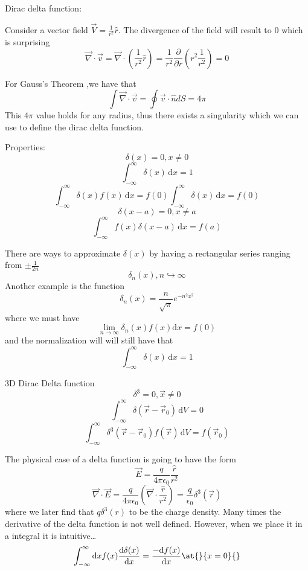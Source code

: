 \begin{remark}
    Dirac delta function:

    Consider a vector field \( \vec{V} = \frac{1}{r^2} \hat{r} \). 
    The divergence of the field will result to 0 which is surprising 
    \[
        \vec{\nabla} \cdot \vec{v} = \vec{\nabla} \cdot \left( \frac{1}{r^2} \hat{r} \right) = \frac{1}{r^2} \frac{\partial }{\partial r} \left( r^2 \frac{1}{r^2} \right) 
        = 0
    \]

    For Gauss's Theorem ,we have that 
    \[
        \int  \vec{\nabla}  \cdot \vec{v} = \oint \vec{v} \cdot \hat{n} dS = 4\pi 
    \]
    This \(4\pi \) value holds for any radius, thus there exists a singularity which we can use to define 
    the dirac delta function. 
    \begin{definition}
        Properties:
        \[
            \delta (x) = 0, x \neq 0
        \]
        \[
            \int_{-\infty}^{\infty} \delta (x)  \,\mathrm{d}x  = 1 
        \]
        \[
            \int_{-\infty}^{\infty} \delta (x) f(x)  \,\mathrm{d}x = f(0) \int_{-\infty}^{\infty}  \delta (x) \,\mathrm{d}x  = f(0)
        \]
        \[
            \delta (x-a) = 0, x \neq a
        \]
        \[
            \int_{-\infty}^{\infty}  f(x) \delta (x-a)\,\mathrm{d}x  = f(a)
        \]
    \end{definition}
    There are ways to approximate \(\delta (x)\) by having a rectangular series ranging from \( \pm\frac{1}{2n}\) 
    \[
        \delta _n (x), n \hookrightarrow \infty 
    \]
    Another example is the function 
    \[
        \delta _n(x) = \frac{n}{\sqrt{\pi } } e^{-n^2 x^{2} } 
    \]
    where we must have 
    \[
        \lim_{n \to \infty} \delta _n(x) f(x) \mathrm{d}x  = f(0)
    \] and the normalization will will still have that 
    \[
        \int_{-\infty}^{\infty}  \delta (x)\,\mathrm{d}x   = 1
    \]

    \begin{definition}
        3D Dirac Delta function
        \[
            \delta ^{3} = 0 , \vec{x} \neq  0
        \]
        \[
            \int_{-\infty}^{\infty}  \delta (\vec{r} - \vec{r} _0)\,\mathrm{d}V = 0 
        \]
        \[
            \int_{-\infty}^{\infty} \delta ^3 (\vec{r} - \vec{r} _0 ) f(\vec{r} )\,\mathrm{d}V = f(\vec{r} _0)
        \]
    \end{definition}
    The physical case of a delta function is going to have the form 
    \[
         \vec{E} = \frac{q}{4 \pi \epsilon _0 } \frac{\hat{r} }{r^{2} }
    \]
    \[
        \vec{\nabla}  \cdot \vec{E}  = \frac{q}{4\pi \epsilon _0}\left( \vec{\nabla} \cdot \frac{\hat{r} }{r^{2} } \right) = \frac{q}{\epsilon _0} \delta  ^3 (\vec{r} )
    \]
    where we later find that \(q \delta ^3 (r) \) to be the charge density. Many times the derivative of the 
    delta function is not well defined. However, when we place it in a integral it is intuitive\dots
    \[
        \int_{-\infty}^{\infty} \mathrm{d}x f(x) \frac{\mathrm{d}\delta (x)}{\mathrm{d}x } = \frac{- \mathrm{d}f(x)}{\mathrm{d}x} \at{}{x=0}{}  
    \]
    
\end{remark}
